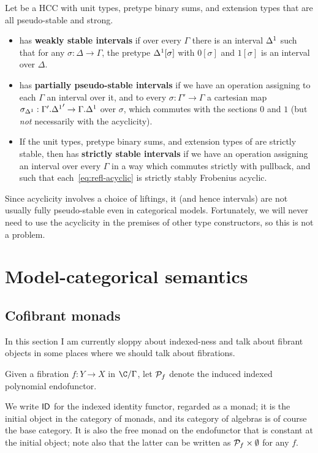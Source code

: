 \documentclass{amsart}
\begin{document}
\begin{defn}
  Let \E be a HCC with unit types, pretype binary sums, and extension types that are all pseudo-stable and strong.
  \begin{itemize}
  \item \E has \textbf{weakly stable intervals} if over every $\Gamma$ there is an interval ${\Delta^1}$ such that for any $\sigma:\Delta\to\Gamma$, the pretype ${\Delta^1}[\sigma]$ with $0[\sigma]$ and $1[\sigma]$ is an interval over $\Delta$.
  \item \E has \textbf{partially pseudo-stable intervals} if we have an operation assigning to each $\Gamma$ an interval over it, and to every $\sigma:\Gamma'\to\Gamma$ a cartesian map $\sigma_{\Delta^1} : \Gamma'.{\Delta^1}' \to \Gamma.{\Delta^1}$ over $\sigma$, which commutes with the sections $0$ and $1$ (but \emph{not} necessarily with the acyclicity).
  \item If the unit types, pretype binary sums, and extension types of \E are strictly stable, then \E has \textbf{strictly stable intervals} if we have an operation assigning an interval over every $\Gamma$ in a way which commutes strictly with pullback, and such that each~\eqref{eq:refl-acyclic} is strictly stably Frobenius acyclic.
  \end{itemize}
\end{defn}

Since acyclicity involves a choice of liftings, it (and hence intervals) are not usually fully pseudo-stable even in categorical models.
Fortunately, we will never need to use the acyclicity in the premises of other type constructors, so this is not a problem.


\section{Model-categorical semantics}
\label{sec:model-categories}

\subsection{Cofibrant monads}
\label{sec:cofibrant-monads}

In this section I am currently sloppy about indexed-ness and talk about fibrant objects in some places where we should talk about fibrations.

Given a fibration $f:Y\to X$ in $\C/\Gamma$, let $\mathcal{P}_{f}$ denote the induced indexed polynomial endofunctor.

We write $\mathsf{ID}$ for the indexed identity functor, regarded as a monad; it is the initial object in the category of monads, and its category of algebras is of course the base category.
It is also the free monad on the endofunctor that is constant at the initial object; note also that the latter can be written as $\mathcal{P}_{f} \times \emptyset$ for any $f$.
\end{document}
